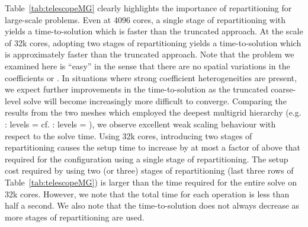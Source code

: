 \documentclass[]{siamart0216}
\begin{document}
\begin{comment}
\begin{table}[h!]
\centering
\caption{Multigrid V-cycle performance. 
Shown are the total setup () and application times () for
several mesh sizes and multigrid solver configurations employing truncation and coarse grid repartitioning. 
The hierarchical information related to repartitioning (``levels'' and ``ranks per level'') is shown in square brackets.
Hierarchical information is ordered from the finest level (left) to the coarsest level (right).
}
\begin{tabular}{r r r r r r}
\toprule
    &levels   &  &ranks per level  & (s) & (s)\\
\toprule
32 &2          &2 &4096                       &--   &8.34E01 \\ 32 &2, 3      &4 &4096, 64                 &8.56E02   &5.23E01 \\ \midrule
64 &2          &2  &32768                    &--                   &1.48E01 \\ 64 &2,2       &3  &32768, 512            &2.34E01   &1.80E01 \\ 64 &2, 3      &4  &32768, 512            &2.30E01                       &1.40E01 \\ 64 &2, 2, 3  &5  &32768, 512, 8        &2.76E01, 2.49E01   &4.89E01 \\ 64 &2, 2, 3  &5  &32768, 4096, 64    &1.64E01, 1.79E01   &1.39E01 \\ \bottomrule
\end{tabular}
\label{tab:telescopeMG}
\end{table}
\end{comment}

Table~\ref{tab:telescopeMG} clearly highlights the importance of repartitioning for large-scale problems.
Even at 4096 cores, a single stage of repartitioning with  yields a time-to-solution which is  faster 
than the truncated  approach. At the scale of 32k cores, adopting two stages of repartitioning yields a time-to-solution 
which is approximately  faster than the truncated approach. 
Note that the problem we examined here is ``easy'' in the sense that there are no spatial variations in the coefficients  or .
In situations where strong coefficient heterogeneities are present, we expect further improvements in the time-to-solution as the 
truncated coarse-level solve will become increasingly more difficult to converge.
Comparing the results from the two meshes which employed the deepest multigrid hierarchy (e.g. : levels =  cf. : levels = ), we observe excellent weak scaling behaviour 
with respect to the solve time. 
Using 32k cores, introducing two stages of repartitioning causes the setup time to increase by at most a 
factor of  above that required for the configuration using a single stage of repartitioning. 
The setup cost required by using two (or three) stages of repartitioning (last three rows of Table~\ref{tab:telescopeMG}) is larger than the time 
required for the entire solve on 32k cores. However, we note that the total time for each operation is less than half a second.
We also note that the time-to-solution does not always decrease as more stages of repartitioning are used.
\end{document}
